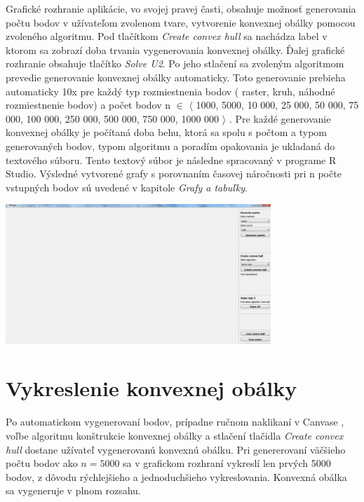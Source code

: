 \documentclass[12pt]{article}
\begin{document}
Grafické rozhranie aplikácie, vo svojej pravej časti, obsahuje možnosť generovania počtu bodov v užívateľom zvolenom tvare, vytvorenie konvexnej obálky pomocou zvoleného algoritmu. Pod tlačítkom \textit{Create convex hull} sa nachádza label v ktorom sa zobrazí doba trvania vygenerovania konvexnej obálky. Ďalej grafické rozhranie obsahuje tlačítko  \textit{Solve U2}. Po jeho stlačení sa zvoleným algoritmom prevedie generovanie konvexnej obálky automaticky. Toto generovanie prebieha automaticky 10x pre každý typ rozmiestnenia bodov ( raster, kruh, náhodné rozmiestnenie bodov) a počet bodov n $\in$ $\langle$ 1000, 5000, 10 000, 25 000, 50 000, 75 000, 100 000, 250 000, 500 000, 750 000, 1000 000 $\rangle$ . Pre každé generovanie konvexnej obálky je počítaná doba behu, ktorá sa spolu s počtom a typom generovaných bodov, typom algoritmu a poradím opakovania je ukladaná do textového súboru. Tento textový súbor je následne spracovaný v programe R Studio. Výsledné vytvorené grafy s porovnaním časovej náročnosti pri n počte vstupných bodov sú uvedené v kapitole \textit{Grafy a tabuľky}. 

\begin{center}
   \includegraphics[width=10cm]{./img/ukazka_aplikacia1.png}
\end{center}


\clearpage 
\section{Vykreslenie konvexnej obálky}
Po automatickom vygenerovaní bodov, prípadne ručnom naklikaní v Canvase , voľbe algoritmu konštrukcie konvexnej obálky a stlačení tlačidla \textit{Create convex hull} dostane užívateľ vygenerovanú konvexnú obálku. Pri genererovaní väčšieho počtu bodov ako $ n = 5000 $ sa v grafickom rozhraní vykreslí len prvých 5000 bodov, z dôvodu rýchlejšieho a jednoduchšieho vykreslovania. Konvexná obálka sa vygeneruje v plnom rozsahu.
 
\end{document}
